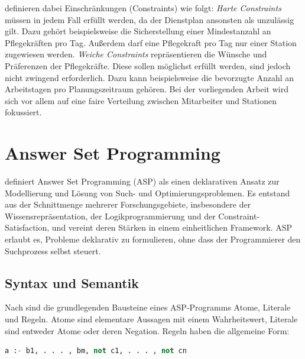 \textcite{Oughalime2008} definieren dabei Einschränkungen (Constraints) wie folgt: \textit{Harte Constraints} müssen in jedem Fall erfüllt werden, da der Dienstplan ansonsten als unzulässig gilt. Dazu gehört beispielsweise die Sicherstellung einer Mindestanzahl an Pflegekräften pro Tag. Außerdem darf eine Pflegekraft pro Tag nur einer Station zugewiesen werden. 
\textit{Weiche Constraints} repräsentieren die Wünsche und Präferenzen der Pflegekräfte. Diese sollen möglichst erfüllt werden, sind jedoch nicht zwingend erforderlich. Dazu kann beispielsweise die bevorzugte Anzahl an Arbeitstagen pro Planungszeitraum gehören. Bei der vorliegenden Arbeit wird sich vor allem auf eine faire Verteilung zwischen Mitarbeiter und Stationen fokussiert.

\section{Answer Set Programming}

\textcite{brewkaAnswerSetProgramming2011} definiert Answer Set Programming (ASP) als einen deklarativen Ansatz zur Modellierung und Lösung von Such- und Optimierungsproblemen. Es entstand aus der Schnittmenge mehrerer Forschungsgebiete, insbesondere der Wissensrepräsentation, der Logikprogrammierung und der Constraint-Satisfaction, und vereint deren Stärken in einem einheitlichen Framework. ASP erlaubt es, Probleme deklarativ zu formulieren, ohne dass der Programmierer den Suchprozess selbst steuert.
\subsection{Syntax und Semantik}
Nach \textcite{brewkaAnswerSetProgramming2011} sind die grundlegenden Bausteine eines ASP-Programms  Atome, Literale und Regeln. Atome sind elementare Aussagen mit einem Wahrheitswert, Literale sind entweder Atome oder deren Negation. \newline Regeln haben die allgemeine Form:
\begin{lstlisting}[language=python]
a :- b1, . . . , bm, not c1, . . . , not cn
\end{lstlisting}

